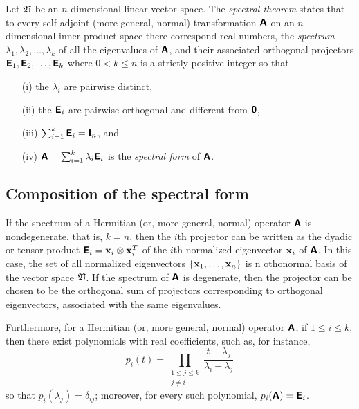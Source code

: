 Let $\frak V$ be an $n$-dimensional linear vector space.
The {\em spectral theorem} states
that to every self-adjoint (more general, normal) transformation $ \textsf{\textbf{A}}$
on an $n$-dimensional inner product space there correspond real numbers, the {\em spectrum}
$
\lambda_1,
\lambda_2, \ldots ,
\lambda_k
$
of all the eigenvalues of   $ \textsf{\textbf{A}}$,
and their associated  orthogonal projectors
$
\textsf{\textbf{E}}_1,
\textsf{\textbf{E}}_2, \ldots ,
\textsf{\textbf{E}}_k
$
where $0<k\le n$ is a strictly positive integer so that
\begin{itemize}
\item[(i)]
the $\lambda_i$ are pairwise distinct,
\item[(ii)]
the $\textsf{\textbf{E}}_i$ are pairwise orthogonal and different from $\textsf{\textbf{0}}$,
\item[(iii)]
$\sum_{i=1}^k \textsf{\textbf{E}}_i=\textsf{\textbf{I}}_n$, and
\item[(iv)]
$
\textsf{\textbf{A}}=\sum_{i=1}^k \lambda_i\textsf{\textbf{E}}_i
$
is the {\em spectral form} of $\textsf{\textbf{A}}$.
\end{itemize}

\subsection{Composition of the spectral form}

If the spectrum of a  Hermitian (or, more general, normal) operator $\textsf{\textbf{A}}$ is nondegenerate, that is, $k=n$, then the
$i$th projector
can be written as the dyadic or tensor product $
\textsf{\textbf{E}}_i={\bf x}_i \otimes {\bf x}_i^T$
of the $i$th normalized eigenvector ${\bf x}_i $ of $\textsf{\textbf{A}}$.
In this case, the set of all normalized eigenvectors $\{{\bf x}_1, \ldots ,{\bf x}_n\}$ is n othonormal basis of the vector space $\frak V$.
If the spectrum of $\textsf{\textbf{A}}$ is degenerate, then the projector can be chosen to be the orthogonal sum of projectors
corresponding to orthogonal eigenvectors, associated with the same  eigenvalues.

Furthermore, for a  Hermitian (or, more general, normal) operator $\textsf{\textbf{A}}$,
if $1\le i \le k$,
then there exist polynomials with real coefficients, such as,  for instance,
\begin{equation}
p_i  (t)
=
\prod_{
\begin{array}{c}
1\le j\le k\\
j\neq i
\end{array}
}\frac{t-\lambda_j}{\lambda_i -\lambda_j}
\label{2011-m-epsf}
\end{equation}
so that
$p_i(\lambda_j) =\delta_{ij}$;
moreover, for every such polynomial,
$p_i(\textsf{\textbf{A}})=\textsf{\textbf{E}}_i$.

